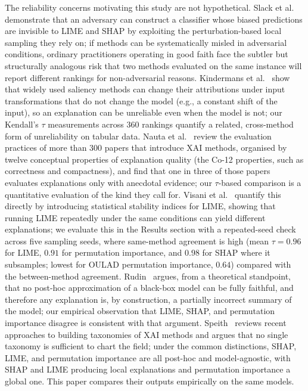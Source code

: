 \documentclass[11pt,twoside,a4paper]{article}
\begin{document}
The reliability concerns motivating this study are not hypothetical. Slack et al.~\citep{slack2020fooling} demonstrate that an adversary can construct a classifier whose biased predictions are invisible to LIME and SHAP by exploiting the perturbation-based local sampling they rely on; if methods can be systematically misled in adversarial conditions, ordinary practitioners operating in good faith face the subtler but structurally analogous risk that two methods evaluated on the same instance will report different rankings for non-adversarial reasons. Kindermans et al.~\citep{kindermans2019unreliability} show that widely used saliency methods can change their attributions under input transformations that do not change the model (e.g., a constant shift of the input), so an explanation can be unreliable even when the model is not; our Kendall's $\tau$ measurements across 360 rankings quantify a related, cross-method form of unreliability on tabular data. Nauta et al.~\citep{nauta2023xaievaluation} review the evaluation practices of more than 300 papers that introduce XAI methods, organised by twelve conceptual properties of explanation quality (the Co-12 properties, such as correctness and compactness), and find that one in three of those papers evaluates explanations only with anecdotal evidence; our $\tau$-based comparison is a quantitative evaluation of the kind they call for. Visani et al.~\citep{visani2022stability} quantify this directly by introducing statistical stability indices for LIME, showing that running LIME repeatedly under the same conditions can yield different explanations; we evaluate this in the Results section with a repeated-seed check across five sampling seeds, where same-method agreement is high (mean $\tau = 0.96$ for LIME, $0.91$ for permutation importance, and $0.98$ for SHAP where it subsamples; lowest for OULAD permutation importance, $0.64$) compared with the between-method agreement. Rudin~\citep{rudin2019stop} argues, from a theoretical standpoint, that no post-hoc approximation of a black-box model can be fully faithful, and therefore any explanation is, by construction, a partially incorrect summary of the model; our empirical observation that LIME, SHAP, and permutation importance disagree is consistent with that argument. Speith~\citep{speith2022taxonomy} reviews recent approaches to building taxonomies of XAI methods and argues that no single taxonomy is sufficient to chart the field; under the common distinctions, SHAP, LIME, and permutation importance are all post-hoc and model-agnostic, with SHAP and LIME producing local explanations and permutation importance a global one. This paper compares their outputs empirically on the same models.
\end{document}
